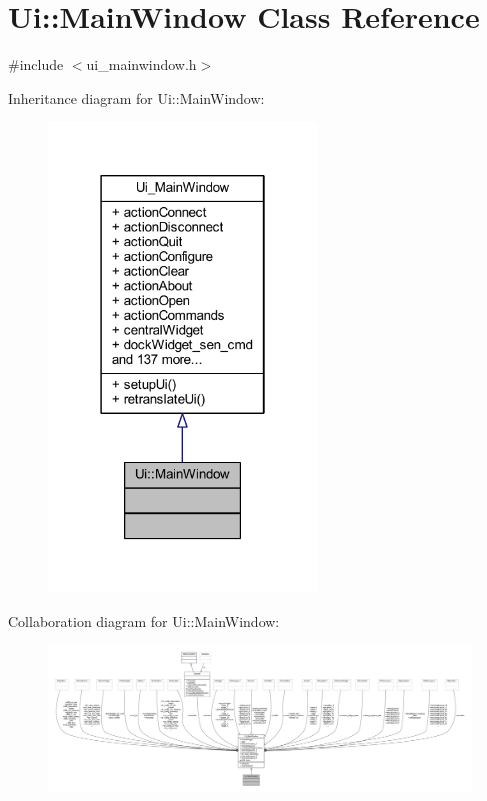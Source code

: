 \hypertarget{a00007}{\section{Ui\+:\+:Main\+Window Class Reference}
\label{a00007}
}


{\ttfamily \#include $<$ui\+\_\+mainwindow.\+h$>$}



Inheritance diagram for Ui\+:\+:Main\+Window\+:
\nopagebreak
\begin{figure}[H]
\begin{center}
\leavevmode
\includegraphics[width=202pt]{d8/d23/a00326}
\end{center}
\end{figure}


Collaboration diagram for Ui\+:\+:Main\+Window\+:
\nopagebreak
\begin{figure}[H]
\begin{center}
\leavevmode
\includegraphics[width=350pt]{d8/dfc/a00327}
\end{center}
\end{figure}
